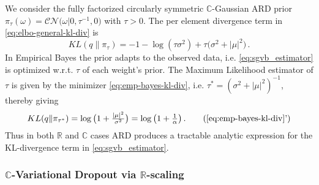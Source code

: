 \documentclass{article}
\newcommand{\real}{\mathbb{R}}
\newcommand{\cplx}{\mathbb{C}}
\newcommand{\tr}[1]{\mathop{tr}{#1}}
\begin{document}
We consider the fully factorized circularly symmetric $\cplx$-Gaussian ARD prior $
  \pi_\tau(\omega)
    = \mathcal{CN}\bigl(
      \omega \vert 0, \tau^{-1}, 0
    \bigr)
$ with $\tau > 0$. The per element divergence term in \eqref{eq:elbo-general-kl-div} is
\begin{equation}  \label{eq:emp-bayes-kl-div}
  KL(q \| \pi_\tau)
    = - 1 - \log{(\tau \sigma^2)}
      + \tau \bigl(
        \sigma^2 + \lvert \mu \rvert^2
      \bigr)
    \,.
\end{equation}
%
%
In Empirical Bayes the prior adapts to the observed data, i.e. \eqref{eq:sgvb_estimator}
is optimized w.r.t. $\tau$ of each weight's prior. The Maximum Likelihood estimator
of $\tau$ is given by the minimizer \eqref{eq:emp-bayes-kl-div}, i.e. $
  \tau^\ast = (\sigma^2 + \lvert \mu \rvert^2)^{-1}
$, thereby giving
\begin{equation}  \label{eq:emp-bayes-opt-kl}
  KL(q \| \pi_{\tau^\ast})
    = \log{\bigl(1 + \tfrac{\lvert \mu \rvert^2}{\sigma^2}\bigr)}
    = \log{\bigl(1 + \tfrac1\alpha \bigr)}
    \,.
    \tag{\ref{eq:emp-bayes-kl-div}'}
\end{equation}
Thus in both $\real$ and $\cplx$ cases ARD produces a tractable analytic expression for
the KL-divergence term in \eqref{eq:sgvb_estimator}.


\subsubsection{$\cplx$-Variational Dropout via $\real$-scaling} %
\label{ssub:real_scaling_dropout}
\end{document}
